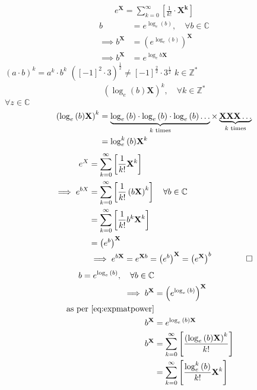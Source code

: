 \documentclass{article}
\begin{document}
\begin{align}
    e^{\mathit{\mathbf{X}}} = \sum^{\infty}_{k= 0}   \left[ \frac{1}{k!} \cdot  \mathit{\mathbf{X^k}} \right] 
\end{align}
\begin{align}
    b &= e^{\log_e{\left( b \right) }}, \quad \forall b \in \mathbb{C} \label{eq:bydef}\\
 \implies  b^{\mathbf{X}}&= \left( e^{\log_e{\left( b \right) }} \right)^{\mathbf{X}} \label{eq:tojustify} \\
  \implies  b^{\mathbf{X}} &= e^{\log_e{b}  \mathbf{X} }
\end{align}
$\left( a\cdot b \right)^{k} = a^k\cdot b^k$
$\left( \left[ - 1 \right]^2 \cdot 3
\right)^{\frac{1}{2}} \neq \left[ - 1 \right]^{\frac{2}{2}} \cdot
3^{\frac{1}{2}}$
$k \in
\mathbb{Z}^{*}$
\begin{align}
    \left( \log_e{\left( b \right) }\mathbf{X} \right)^{k} , \quad \forall k \in \mathbb{Z^{*}}
\end{align}
$\forall z \in \mathbb{C}$
\begin{align}
 \left( \log_e{\left( b \right) }\mathbf{X} \right)^{k} &=    \underbrace{\log_e{\left( b \right) }\cdot  \log_e{\left( b \right) } \cdot  \log_e{\left( b \right) }\ldots }_{k \text{ times}} \times \underbrace{\mathbf{X}\mathbf{X}\mathbf{X}\ldots}_{k \text{ times}} \notag \\
 &= \log_e^k{\left( b \right) } \mathbf{X}^k \label{eq:matpower}
\end{align}
\begin{align}
    e^{X}&= \sum^{\infty}_{k= 0}   \left[ \frac{1}{k!} \mathbf{X}^{k} \right]  \notag \\
    \implies  e^{bX}&= \sum^{\infty}_{k= 0}   \left[ \frac{1}{k!} \left( b\mathbf{X} \right)^{k} \right] \quad \forall b \in \mathbb{C} \notag \\
    &= \sum^{\infty}_{k= 0}   \left[ \frac{1}{k!}b^k \mathbf{X}^k \right] \notag \\
    &= \left( e^b \right)^{\mathbf{X}} \notag \\
    &\implies  e^{b \mathbf{X}} = e^{\mathbf{X}b}= \left( e^b \right)^{\mathbf{X}}= \left( e^{\mathbf{X}} \right)^b  \qquad \qquad \square \label{eq:expmatpower}
\end{align}
\begin{align}
   b = e^{\log_e{\left( b \right) }}, \quad \forall b \in \mathbb{C} \notag \\
    \implies  b^{\mathbf{X}} &= \left( e^{\log_e{\left( b \right) }} \right)^{\mathbf{X}} \notag \\
     \text{as per \eqref{eq:expmatpower}} \notag \\
    b^{\mathbf{X}} &=  e^{\log_e{\left( b \right) } {\mathbf{X}}}  \notag \\
     b^{\mathbf{X}} &= \sum^{\infty}_{k= 0}   \left[ \frac{\left( \log_e{\left( b \right) }\mathbf{X} \right)^k}{k!} \right]  \notag \\
     &= \sum^{\infty}_{k= 0}   \left[ \frac{\log_e ^{k}{\left( b \right) }}{k!}\mathbf{X}^{k} \right]
\end{align}
\end{document}
